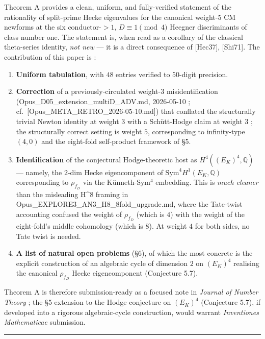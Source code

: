\documentclass[
  11pt,
  a4paper,
]{amsart}
\providecommand{\tightlist}{\setlength{\itemsep}{0pt}\setlength{\parskip}{0pt}}
\providecommand{\tightlist}{%
  \setlength{\itemsep}{0pt}\setlength{\parskip}{0pt}}
\begin{document}
Theorem A provides a clean, uniform, and fully-verified statement of the rationality of split-prime Hecke eigenvalues for the canonical weight-\(5\) CM newforms at the six conductor-\(> 1\), \(D \equiv 1 \pmod 4\) Heegner discriminants of class number one. The statement is, when read as a corollary of the classical theta-series identity, \emph{not new} --- it is a direct consequence of {[}Hec37{]}, {[}Shi71{]}. The contribution of this paper is :

\begin{enumerate}
\def\labelenumi{\arabic{enumi}.}
\tightlist
\item
  \textbf{Uniform tabulation}, with \(48\) entries verified to \(50\)-digit precision.
\item
  \textbf{Correction} of a previously-circulated weight-\(3\) misidentification (Opus\_D05\_extension\_multiD\_ADV.md, 2026-05-10 ; cf.~{[}Opus\_META\_RETRO\_2026-05-10.md{]}) that conflated the structurally trivial Newton identity at weight \(3\) with a Schütt-Hodge claim at weight \(3\) ; the structurally correct setting is weight \(5\), corresponding to infinity-type \((4, 0)\) and the eight-fold self-product framework of §5.
\item
  \textbf{Identification} of the conjectural Hodge-theoretic host as \(H^4((E_K)^4, \mathbb{Q})\) --- namely, the \(2\)-dim Hecke eigencomponent of \(\mathrm{Sym}^4 H^1(E_K, \mathbb{Q})\) corresponding to \(\rho_{f_D}\) via the Künneth-Sym\(^4\) embedding. This is \emph{much cleaner} than the misleading H\^{}8 framing in Opus\_EXPLORE3\_AN3\_H8\_8fold\_upgrade.md, where the Tate-twist accounting confused the weight of \(\rho_{f_D}\) (which is \(4\)) with the weight of the eight-fold's middle cohomology (which is \(8\)). At weight \(4\) for both sides, no Tate twist is needed.
\item
  \textbf{A list of natural open problems} (§6), of which the most concrete is the explicit construction of an algebraic cycle of dimension \(2\) on \((E_K)^4\) realising the canonical \(\rho_{f_D}\) Hecke eigencomponent (Conjecture 5.7).
\end{enumerate}

Theorem A is therefore submission-ready as a focused note in \emph{Journal of Number Theory} ; the §5 extension to the Hodge conjecture on \((E_K)^4\) (Conjecture 5.7), if developed into a rigorous algebraic-cycle construction, would warrant \emph{Inventiones Mathematicae} submission.

\begin{center}\rule{0.5\linewidth}{0.5pt}\end{center}
\end{document}
